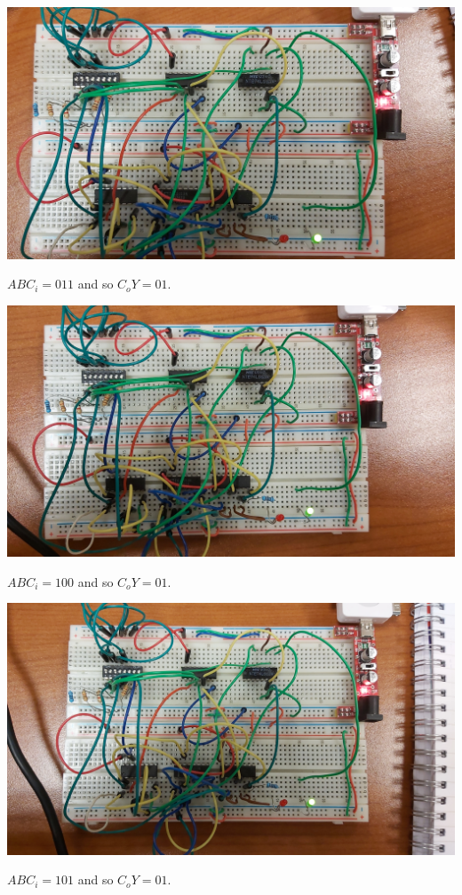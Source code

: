 \documentclass{article}
\begin{document}
\vspace{2em}

\includegraphics[width=\textwidth]{./figures/01100.jpg}
\begin{center}
	$ABC_i = 011$ and so $C_o Y= 01$.
\end{center}


\includegraphics[width=\textwidth]{./figures/10000.jpg}
\begin{center}
	$ABC_i = 100$ and so $C_o Y= 01$.
\end{center}

\vspace{2em}

\includegraphics[width=\textwidth]{./figures/10100.jpg}
\begin{center}
	$ABC_i = 101$ and so $C_o Y= 01$.
\end{center}
\end{document}
